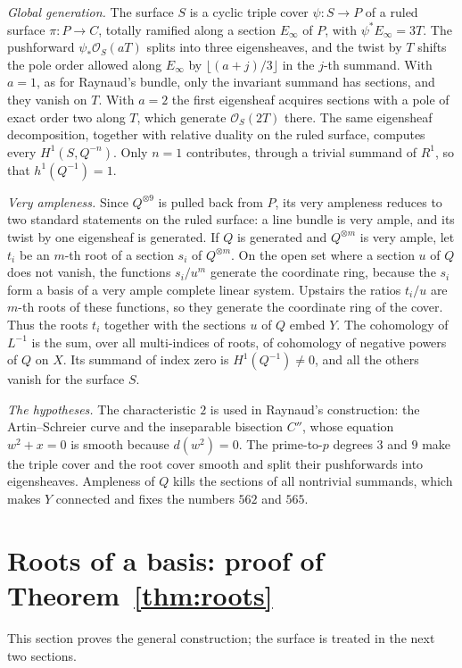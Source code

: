 \documentclass[11pt,a4paper]{article}
\theoremstyle{plain}
\theoremstyle{remark}
\newcommand{\OO}{\mathcal O}
\begin{document}
\emph{Global generation.} The surface $S$ is a cyclic triple cover $\psi:S\to P$ of a ruled surface $\pi:P\to C$,
totally ramified along a section $E_\infty$ of $P$, with $\psi^*E_\infty=3T$. The pushforward
$\psi_*\OO_S(aT)$ splits into three eigensheaves, and the twist by $T$ shifts the pole order allowed along $E_\infty$
by $\lfloor (a+j)/3\rfloor$ in the $j$-th summand. With $a=1$, as for Raynaud's bundle, only the invariant summand has
sections, and they vanish on $T$. With $a=2$ the first eigensheaf acquires sections with a pole of exact order two along
$T$, which generate $\OO_S(2T)$ there. The same eigensheaf decomposition, together with relative duality on the
ruled surface, computes every $H^1(S,Q^{-n})$. Only $n=1$ contributes, through a trivial summand of $R^1$, so that
$h^1(Q^{-1})=1$.

\emph{Very ampleness.} Since $Q^{\otimes9}$ is pulled back from $P$, its very ampleness reduces to two standard
statements on the ruled surface: a line bundle is very ample, and its twist by one eigensheaf is generated. If $Q$ is
generated and $Q^{\otimes m}$ is very ample, let $t_i$ be an $m$-th root of a section $s_i$ of $Q^{\otimes m}$. On the
open set where a section $u$ of $Q$ does not vanish, the functions $s_i/u^m$ generate the coordinate ring, because the
$s_i$ form a basis of a very ample complete linear system. Upstairs the ratios $t_i/u$ are $m$-th roots of these
functions, so they generate the coordinate ring of the cover. Thus the roots $t_i$ together with the sections $u$ of
$Q$ embed $Y$. The cohomology of $L^{-1}$ is the sum, over all multi-indices of roots, of cohomology of negative powers
of $Q$ on $X$. Its summand of index zero is $H^1(Q^{-1})\neq0$, and all the others vanish for the surface $S$.

\emph{The hypotheses.} The characteristic $2$ is used in Raynaud's construction: the Artin--Schreier curve and the
inseparable bisection $C''$, whose equation $w^2+x=0$ is smooth because $d(w^2)=0$. The prime-to-$p$ degrees $3$ and $9$
make the triple cover and the root cover smooth and split their pushforwards into eigensheaves. Ampleness of $Q$ kills
the sections of all nontrivial summands, which makes $Y$ connected and fixes the numbers $562$ and $565$.

\section{Roots of a basis: proof of Theorem~\ref{thm:roots}}

This section proves the general construction; the surface is treated in the next two sections.
\end{document}
